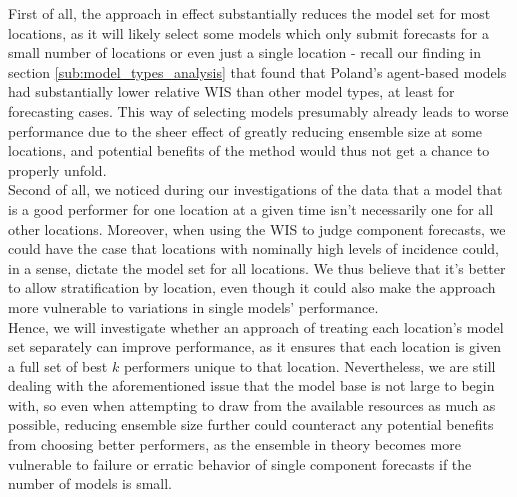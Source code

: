 First of all, the approach in effect substantially reduces the model set for most locations, as it will likely select some models which only submit forecasts for a small number of locations or even just a single location - recall our finding in section \ref{sub:model_types_analysis} that found that Poland's agent-based models had substantially lower relative WIS than other model types, at least for forecasting cases. This way of selecting models presumably already leads to worse performance due to the sheer effect of greatly reducing ensemble size at some locations, and potential benefits of the method would thus not get a chance to properly unfold.\\
Second of all, we noticed during our investigations of the data that a model that is a good performer for one location at a given time isn't necessarily one for all other locations. Moreover, when using the WIS to judge component forecasts, we could have the case that locations with nominally high levels of incidence could, in a sense, dictate the model set for all locations. We thus believe that it's better to allow stratification by location, even though it could also make the approach more vulnerable to variations in single models' performance. \\
Hence, we will investigate whether an approach of treating each location's model set separately can improve performance, as it ensures that each location is given a full set of best $k$ performers unique to that location. Nevertheless, we are still dealing with the aforementioned issue that the model base is not large to begin with, so even when attempting to draw from the available resources as much as possible, reducing ensemble size further could counteract any potential benefits from choosing better performers, as the ensemble in theory becomes more vulnerable to failure or erratic behavior of single component forecasts if the number of models is small. \medskip\\%
